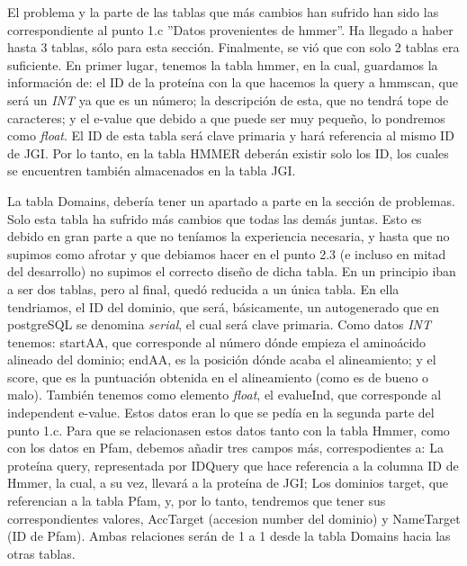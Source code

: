 \documentclass[11pt]{article} %
\begin{document}
El problema y la parte de las tablas que m\'as cambios han sufrido han sido las  correspondiente al punto 1.c ''Datos provenientes de hmmer''. Ha llegado a haber hasta 3 tablas, s\'olo para esta secci\'on. Finalmente, se vi\'o que con solo 2 tablas era suficiente. En primer lugar, tenemos la tabla hmmer, en la cual, guardamos la informaci\'on de: el ID de la prote\'ina con la que hacemos la query a hmmscan, que ser\'a un \emph{INT} ya que es un n\'umero; la descripci\'on de esta, que no tendr\'a  tope de caracteres; y el e-value que debido a que puede ser muy peque\~no, lo pondremos como \emph{float}. El ID de esta tabla ser\'a clave primaria y har\'a referencia al mismo ID de JGI. Por lo tanto, en la tabla HMMER deber\'an existir solo los ID, los cuales se encuentren tambi\'en almacenados en la tabla JGI. 

La tabla Domains, deber\'ia tener un apartado a parte en la secci\'on de problemas. Solo esta tabla ha sufrido m\'as cambios que todas las dem\'as juntas. Esto es debido en gran parte a que no ten\'iamos la experiencia necesaria, y hasta que no supimos como afrotar y que debiamos hacer en el punto 2.3 (e incluso en mitad del desarrollo) no supimos el correcto dise\~no de dicha tabla. En un principio iban a ser dos tablas, pero al final, qued\'o reducida a un \'unica tabla. En ella tendriamos, el ID del dominio, que ser\'a, b\'asicamente, un autogenerado que en postgreSQL se denomina \emph{serial}, el cual ser\'a clave primaria. Como datos \emph{INT} tenemos: startAA, que corresponde al n\'umero d\'onde empieza el amino\'acido alineado del dominio; endAA, es la posici\'on d\'onde acaba el alineamiento; y el score, que es la puntuaci\'on obtenida en el alineamiento (como es de bueno o malo). Tambi\'en tenemos como elemento \emph{float}, el evalueInd, que corresponde al independent e-value. Estos datos eran lo que se ped\'ia en la segunda parte del punto 1.c. Para que se relacionasen estos datos tanto con la tabla Hmmer, como con los datos en Pfam, debemos a\~nadir tres campos m\'as, correspodientes a: La prote\'ina query, representada por IDQuery que hace referencia a la columna ID de Hmmer, la cual, a su vez, llevar\'a a la prote\'ina de JGI; Los dominios target, que referencian a la tabla Pfam, y, por lo tanto, tendremos que tener sus correspondientes valores, AccTarget (accesion number del dominio) y NameTarget (ID de Pfam). Ambas relaciones ser\'an de 1 a 1 desde la tabla Domains hacia las otras tablas.
\end{document}
